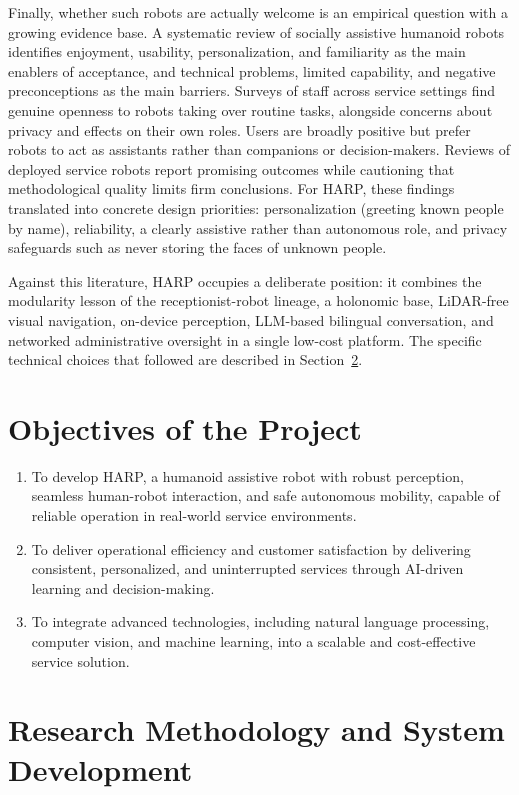 \documentclass[11pt,a4paper]{article}
\begin{document}
Finally, whether such robots are actually welcome is an empirical question with a growing evidence base. A systematic review of socially assistive humanoid robots identifies enjoyment, usability, personalization, and familiarity as the main enablers of acceptance, and technical problems, limited capability, and negative preconceptions as the main barriers. Surveys of staff across service settings find genuine openness to robots taking over routine tasks, alongside concerns about privacy and effects on their own roles. Users are broadly positive but prefer robots to act as assistants rather than companions or decision-makers. Reviews of deployed service robots report promising outcomes while cautioning that methodological quality limits firm conclusions. For HARP, these findings translated into concrete design priorities: personalization (greeting known people by name), reliability, a clearly assistive rather than autonomous role, and privacy safeguards such as never storing the faces of unknown people.

Against this literature, HARP occupies a deliberate position: it combines the modularity lesson of the receptionist-robot lineage, a holonomic base, LiDAR-free visual navigation, on-device perception, LLM-based bilingual conversation, and networked administrative oversight in a single low-cost platform. The specific technical choices that followed are described in Section~\ref{sec:methodology}.

\section{Objectives of the Project}

\begin{enumerate}
\item To develop HARP, a humanoid assistive robot with robust perception, seamless human-robot interaction, and safe autonomous mobility, capable of reliable operation in real-world service environments.
\item To deliver operational efficiency and customer satisfaction by delivering consistent, personalized, and uninterrupted services through AI-driven learning and decision-making.
\item To integrate advanced technologies, including natural language processing, computer vision, and machine learning, into a scalable and cost-effective service solution.
\end{enumerate}

\section{Research Methodology and System Development}
\label{sec:methodology}
\end{document}
